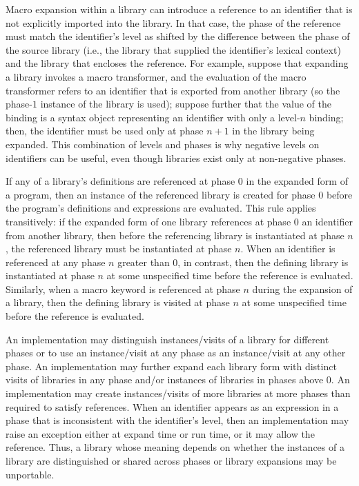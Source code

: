Macro expansion within a library can introduce a reference to an
identifier that is not explicitly imported into the library. In that
case, the phase of the reference must match the identifier's level as
shifted by the difference between the phase of the source library
(i.e., the library that supplied the identifier's lexical context) and
the library that encloses the reference. For example, suppose that
expanding a library invokes a macro transformer, and the evaluation of
the macro transformer refers to an identifier that is exported from
another library (so the phase-$1$ instance of the library is used);
suppose further that the value of the binding is a syntax object
representing an identifier with only a level-$n$ binding; then, the
identifier must be used only at phase $n+1$ in the
library being expanded. This combination of levels and phases is why
negative levels on identifiers can be useful, even though libraries
exist only at non-negative phases.

If any of a library's definitions are referenced at phase $0$ in the
expanded form of a program, then an instance of the referenced library
is created for phase $0$ before the program's definitions and
expressions are evaluated. This rule applies transitively: if the
expanded form of one library references at phase $0$ an identifier
from another library, then before the referencing library is
instantiated at phase $n$, the referenced library must be instantiated
at phase $n$. When an identifier is referenced at any phase $n$
greater than $0$, in contrast, then the defining library is
instantiated at phase $n$ at some unspecified time before the
reference is evaluated. Similarly, when a macro keyword is referenced at
phase $n$ during the expansion of a library, then the
defining library is visited at phase $n$ at some unspecified time
before the reference is evaluated.

An implementation may distinguish instances/visits of a library for
different phases or to use an instance/visit at any phase as an instance/visit at
any other phase. An implementation may further
expand each {\cf library} form with distinct
visits of libraries in any phase and/or instances of
libraries in phases above $0$. An implementation may
create instances/visits of more libraries at more phases than required to
satisfy references. When an identifier appears as an expression in a
phase that is inconsistent with the identifier's level, then an
implementation may raise an exception either at expand time or run
time, or it may allow the reference. Thus, a library whose meaning depends on whether the
instances of a library are distinguished or shared across phases or
{\cf library} expansions may be unportable.


